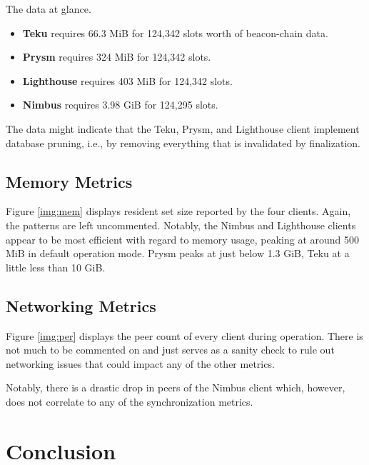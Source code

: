 \documentclass[twoside,twocolumn]{article}
\begin{document}
The data at glance.
\begin{itemize}
\item \textbf{Teku} requires 66.3 MiB for 124,342 slots worth of beacon-chain data.
\item \textbf{Prysm} requires 324 MiB for 124,342 slots.
\item \textbf{Lighthouse} requires 403 MiB for 124,342 slots.
\item \textbf{Nimbus} requires 3.98 GiB for 124,295 slots.
\end{itemize}

The data might indicate that the Teku, Prysm, and Lighthouse client implement database pruning, i.e., by removing everything that is invalidated by finalization.\par

\subsection{Memory Metrics}
Figure \ref{img:mem} displays resident set size reported by the four clients. Again, the patterns are left uncommented. Notably, the Nimbus and Lighthouse clients appear to be most efficient with regard to memory usage, peaking at around 500 MiB in default operation mode. Prysm peaks at just below 1.3 GiB, Teku at a little less than 10 GiB.\par

\subsection{Networking Metrics}
\label{sec:perf:p2p}
Figure \ref{img:per} displays the peer count of every client during operation. There is not much to be commented on and just serves as a sanity check to rule out networking issues that could impact any of the other metrics.\par

Notably, there is a drastic drop in peers of the Nimbus client which, however, does not correlate to any of the synchronization metrics.\par

\section{Conclusion}

\end{document}
